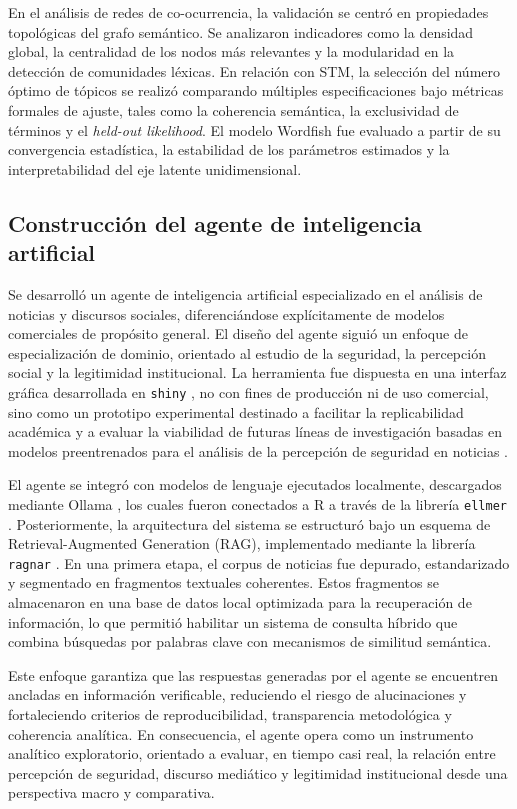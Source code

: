 \documentclass[sn-basic,pdflatex]{sn-jnl}
\theoremstyle{remark}
\theoremstyle{definition}
\begin{document}
En el análisis de redes de co-ocurrencia, la validación se centró en
propiedades topológicas del grafo semántico. Se analizaron indicadores
como la densidad global, la centralidad de los nodos más relevantes y la
modularidad en la detección de comunidades léxicas. En relación con STM,
la selección del número óptimo de tópicos se realizó comparando
múltiples especificaciones bajo métricas formales de ajuste, tales como
la coherencia semántica, la exclusividad de términos y el \emph{held-out
likelihood}. El modelo Wordfish fue evaluado a partir de su convergencia
estadística, la estabilidad de los parámetros estimados y la
interpretabilidad del eje latente unidimensional.

\subsection{Construcción del agente de inteligencia
artificial}\label{construcciuxf3n-del-agente-de-inteligencia-artificial}

Se desarrolló un agente de inteligencia artificial especializado en el
análisis de noticias y discursos sociales, diferenciándose
explícitamente de modelos comerciales de propósito general. El diseño
del agente siguió un enfoque de especialización de dominio, orientado al
estudio de la seguridad, la percepción social y la legitimidad
institucional. La herramienta fue dispuesta en una interfaz gráfica
desarrollada en \texttt{shiny} \citep{chang2025}, no con fines de
producción ni de uso comercial, sino como un prototipo experimental
destinado a facilitar la replicabilidad académica y a evaluar la
viabilidad de futuras líneas de investigación basadas en modelos
preentrenados para el análisis de la percepción de seguridad en noticias
\citep{kmainasi2025}.

El agente se integró con modelos de lenguaje ejecutados localmente,
descargados mediante Ollama \citep{ollama2025}, los cuales fueron
conectados a R a través de la librería \texttt{ellmer}
\citep{wickham2025ellmer}. Posteriormente, la arquitectura del sistema
se estructuró bajo un esquema de Retrieval-Augmented Generation (RAG),
implementado mediante la librería \texttt{ragnar}
\citep{kalinowski2025}. En una primera etapa, el corpus de noticias fue
depurado, estandarizado y segmentado en fragmentos textuales coherentes.
Estos fragmentos se almacenaron en una base de datos local optimizada
para la recuperación de información, lo que permitió habilitar un
sistema de consulta híbrido que combina búsquedas por palabras clave con
mecanismos de similitud semántica.

Este enfoque garantiza que las respuestas generadas por el agente se
encuentren ancladas en información verificable, reduciendo el riesgo de
alucinaciones y fortaleciendo criterios de reproducibilidad,
transparencia metodológica y coherencia analítica. En consecuencia, el
agente opera como un instrumento analítico exploratorio, orientado a
evaluar, en tiempo casi real, la relación entre percepción de seguridad,
discurso mediático y legitimidad institucional desde una perspectiva
macro y comparativa.


\end{document}
